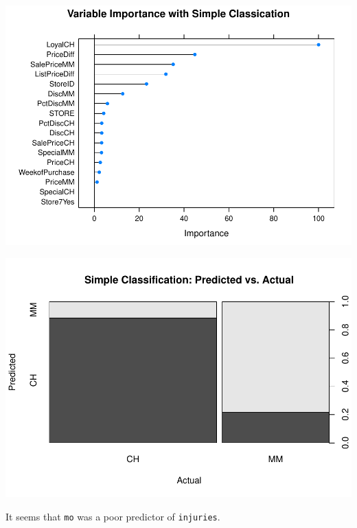 \documentclass[
]{book}
\newenvironment{Shaded}{\begin{snugshade}}{\end{snugshade}}
\newcommand{\DataTypeTok}[1]{\textcolor[rgb]{0.13,0.29,0.53}{#1}}
\newcommand{\KeywordTok}[1]{\textcolor[rgb]{0.13,0.29,0.53}{\textbf{#1}}}
\newcommand{\NormalTok}[1]{#1}
\newcommand{\OperatorTok}[1]{\textcolor[rgb]{0.81,0.36,0.00}{\textbf{#1}}}
\newcommand{\StringTok}[1]{\textcolor[rgb]{0.31,0.60,0.02}{#1}}
\begin{document}
\includegraphics{data-sci_files/figure-latex/unnamed-chunk-55-1.pdf}

\begin{Shaded}
\end{Shaded}

\includegraphics{data-sci_files/figure-latex/unnamed-chunk-56-1.pdf}

It seems that \texttt{mo} was a poor predictor of \texttt{injuries}.
\end{document}
